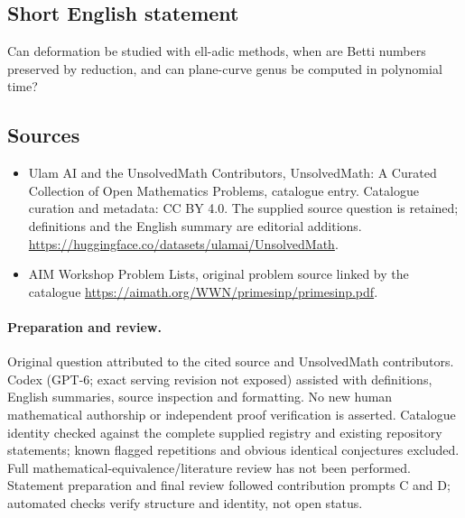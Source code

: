 \documentclass[11pt]{article}
\begin{document}
\subsection{Short English statement}
Can deformation be studied with ell-adic methods, when are Betti numbers preserved by reduction, and can plane-curve genus be computed in polynomial time?
\subsection{Sources}
\begin{itemize}
\item[\hypertarget{source:statement:1}{S1}] Ulam AI and the UnsolvedMath Contributors, UnsolvedMath: A Curated Collection of Open Mathematics Problems, catalogue entry. Catalogue curation and metadata: CC BY 4.0. The supplied source question is retained; definitions and the English summary are editorial additions.
\url{https://huggingface.co/datasets/ulamai/UnsolvedMath}.
\item[\hypertarget{source:statement:2}{S2}] AIM Workshop Problem Lists, original problem source linked by the catalogue
\url{https://aimath.org/WWN/primesinp/primesinp.pdf}.
\end{itemize}
\paragraph{Preparation and review.}
Original question attributed to the cited source and UnsolvedMath contributors. Codex (GPT-6; exact serving revision not exposed) assisted with definitions, English summaries, source inspection and formatting. No new human mathematical authorship or independent proof verification is asserted. Catalogue identity checked against the complete supplied registry and existing repository statements; known flagged repetitions and obvious identical conjectures excluded. Full mathematical-equivalence/literature review has not been performed. Statement preparation and final review followed contribution prompts C and D; automated checks verify structure and identity, not open status.
\label{end:statement}
\end{document}
